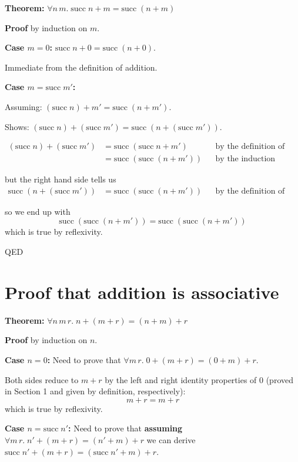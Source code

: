 \documentclass[11pt]{article}
\begin{document}
\textbf{Theorem:} $\forall n\, m.\; \text{succ}\; n + m = \text{succ}\;(n + m)$

\textbf{Proof} by induction on $m$.

\textbf{Case $m = 0$:} $\text{succ}\; n + 0 = \text{succ}\;(n + 0)$.

Immediate from the definition of addition.

\textbf{Case $m = \text{succ}\; m'$:}

Assuming: $(\text{succ}\; n) + m' = \text{succ}\;(n + m')$.

Shows: $(\text{succ}\; n) + (\text{succ}\; m') = \text{succ}\;(n + (\text{succ}\; m'))$.

\begin{align*}
(\text{succ}\; n) + (\text{succ}\; m')
  &= \text{succ}\;(\text{succ}\; n + m') && \text{by the definition of addition} \\
  &= \text{succ}\;(\text{succ}\;(n + m')) && \text{by the induction hypothesis}
\end{align*}

but the right hand side tells us
\begin{align*}
\text{succ}\;(n + (\text{succ}\; m')) &= \text{succ}\;(\text{succ}\;(n + m')) && \text{by the definition of addition}
\end{align*}

so we end up with
\[
\text{succ}\;(\text{succ}\;(n + m')) = \text{succ}\;(\text{succ}\;(n + m'))
\]
which is true by reflexivity.

QED

\section{Proof that addition is associative}

\textbf{Theorem:} $\forall n\, m\, r.\; n + (m + r) = (n + m) + r$

\textbf{Proof} by induction on $n$.

\textbf{Case $n = 0$:} Need to prove that $\forall m\, r.\; 0 + (m + r) = (0 + m) + r$.

Both sides reduce to $m + r$ by the left and right identity properties of 0 (proved in Section 1 and given by definition, respectively):
\[
m + r = m + r
\]
which is true by reflexivity.

\textbf{Case $n = \text{succ}\; n'$:} Need to prove that \textbf{assuming} $\forall m\, r.\; n' + (m + r) = (n' + m) + r$ we can derive $\text{succ}\; n' + (m + r) = (\text{succ}\; n' + m) + r$.
\end{document}
